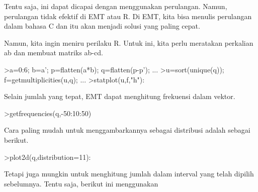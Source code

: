 \documentclass[12pt,arial,letterpaper]{book}
\begin{document}
\begin{eulercomment}
\begin{eulercomment}
\begin{eulercomment}
\begin{eulercomment}
\begin{eulercomment}
\begin{eulercomment}
\begin{eulercomment}
\begin{eulercomment}
\begin{eulercomment}
\begin{eulercomment}
\begin{eulercomment}
\begin{eulercomment}
\begin{eulercomment}
\begin{eulercomment}
\begin{eulercomment}
\begin{eulercomment}
\begin{eulercomment}
\begin{eulercomment}
\begin{eulercomment}
\begin{eulercomment}
\begin{eulercomment}
\begin{eulercomment}
\begin{eulercomment}
\begin{eulercomment}
\begin{eulercomment}
\begin{eulercomment}
\begin{eulercomment}
\begin{eulercomment}
\begin{eulercomment}
\begin{eulercomment}
\begin{eulercomment}
\begin{eulercomment}
\begin{eulercomment}
\begin{eulercomment}
\begin{eulercomment}
\begin{eulercomment}
\begin{eulercomment}
Tentu saja, ini dapat dicapai dengan menggunakan perulangan. Namun,
perulangan tidak efektif di EMT atau R. Di EMT, kita bisa menulis
perulangan dalam bahasa C dan itu akan menjadi solusi yang paling
cepat.

Namun, kita ingin meniru perilaku R. Untuk ini, kita perlu meratakan
perkalian ab dan membuat matriks ab-cd.
\end{eulercomment}
\begin{eulerprompt}
>a=0:6; b=a'; p=flatten(a*b); q=flatten(p-p'); ...
>u=sort(unique(q)); f=getmultiplicities(u,q); ...
>statplot(u,f,"h"):
\end{eulerprompt}
\begin{eulercomment}
Selain jumlah yang tepat, EMT dapat menghitung frekuensi dalam vektor.
\end{eulercomment}
\begin{eulerprompt}
>getfrequencies(q,-50:10:50)
\end{eulerprompt}
\begin{euleroutput}
  [0,  23,  132,  316,  602,  801,  333,  141,  53,  0]
\end{euleroutput}
\begin{eulercomment}
Cara paling mudah untuk menggambarkannya sebagai distribusi adalah
sebagai berikut.
\end{eulercomment}
\begin{eulerprompt}
>plot2d(q,distribution=11):
\end{eulerprompt}
\begin{eulercomment}
Tetapi juga mungkin untuk menghitung jumlah dalam interval yang telah
dipilih sebelumnya. Tentu saja, berikut ini menggunakan

\end{eulercomment}
\end{eulercomment}
\end{eulercomment}
\end{eulercomment}
\end{eulercomment}
\end{eulercomment}
\end{eulercomment}
\end{eulercomment}
\end{eulercomment}
\end{eulercomment}
\end{eulercomment}
\end{eulercomment}
\end{eulercomment}
\end{eulercomment}
\end{eulercomment}
\end{eulercomment}
\end{eulercomment}
\end{eulercomment}
\end{eulercomment}
\end{eulercomment}
\end{eulercomment}
\end{eulercomment}
\end{eulercomment}
\end{eulercomment}
\end{eulercomment}
\end{eulercomment}
\end{eulercomment}
\end{eulercomment}
\end{eulercomment}
\end{eulercomment}
\end{eulercomment}
\end{eulercomment}
\end{eulercomment}
\end{eulercomment}
\end{eulercomment}
\end{eulercomment}
\end{eulercomment}
\end{document}
